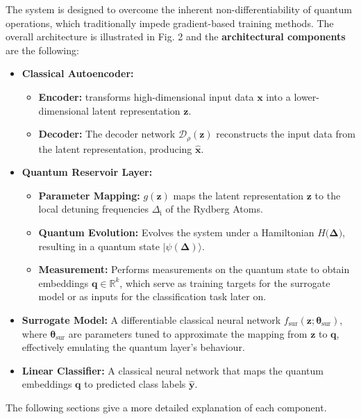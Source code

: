 \documentclass[conference]{IEEEtran}
\begin{document}
The system is designed to overcome the inherent non-differentiability of quantum operations, which traditionally impede gradient-based training methods.
The overall architecture is illustrated in Fig. 2 and the \textbf{architectural components} are the following:
\begin{itemize}
    \item \textbf{Classical Autoencoder:}
        \begin{itemize}
            \item \textbf{Encoder:}
            transforms high-dimensional input data \(\bm{x} \) into 
            a lower-dimensional latent representation \(\bm{z}\).
            \item \textbf{Decoder:}
            The decoder network \(\mathcal{D}_\rho(\bm{z})\) reconstructs the input data from the latent representation, producing \(\bm{\hat{x}}\).
        \end{itemize}

    \item \textbf{Quantum Reservoir Layer:}
        \begin{itemize}
            \item \textbf{Parameter Mapping:}
            \(g(\bm{z})\) maps the latent representation \(\bm{z}\) to the local detuning frequencies
            \(\Delta_{\mathrm{i}}\) of the Rydberg Atoms.
            \item \textbf{Quantum Evolution:}
            Evolves the system under a Hamiltonian \(H(\bm{\Delta)}\), resulting in a quantum 
            state \(|\psi(\bm{\Delta})\rangle\).
            \item \textbf{Measurement:}
            Performs measurements on the quantum state to obtain embeddings \(\bm{q} \in \mathbb{R}^k\), which serve as training targets for the surrogate model or as 
            inputs for the classification task later on.
        \end{itemize}

    \item \textbf{Surrogate Model:}
    A differentiable classical neural network \( f_{\text{sur}}(\bm{z}; \bm{\theta}_{\text{sur}}) \),
    where \(\bm{\theta}_{\text{sur}}\) are parameters tuned to approximate the 
    mapping from \(\bm{z}\) to \(\bm{q}\), effectively emulating
    the quantum layer's behaviour.

    \item \textbf{Linear Classifier:}
    A classical neural network that maps the quantum embeddings \(\bm{q}\) to 
    predicted class labels \(\bm{\hat{y}}\).

\end{itemize}
The following sections give a more detailed explanation of each component.
\end{document}
